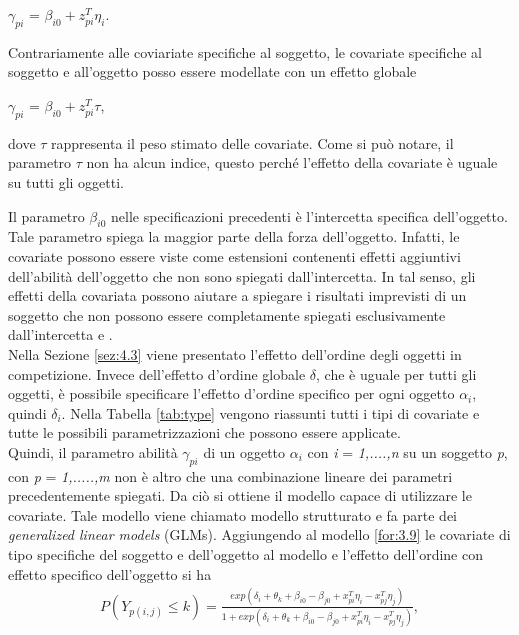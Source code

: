 \begin{itemize}
	\begin{center}
		$ \gamma_{pi}$ = $\beta_{i0} + z^{T}_{pi}\eta_i$.
	\end{center}
	Contrariamente alle coviariate specifiche al soggetto, le covariate specifiche al soggetto e all'oggetto posso essere modellate con un effetto globale
	\begin{center}
		$ \gamma_{pi}$ = $\beta_{i0} + z^{T}_{pi}\tau$,
	\end{center}
	dove $\tau$ rappresenta il peso stimato delle covariate. Come si può notare, il parametro $\tau$ non ha alcun indice, questo perché l'effetto della covariate è uguale su tutti gli oggetti.
\end{itemize}


Il parametro $\beta_{i0}$ nelle specificazioni precedenti è l'intercetta specifica dell'oggetto. Tale parametro spiega la maggior parte della forza dell'oggetto. Infatti, le covariate possono essere viste come estensioni contenenti effetti aggiuntivi dell'abilità dell'oggetto che non sono spiegati dall'intercetta. In tal senso, gli effetti della covariata possono aiutare a spiegare i risultati imprevisti di un soggetto che non possono essere completamente spiegati esclusivamente dall'intercetta \autocite{cattelan2012models} e \autocite{schauberger2017}.\\
Nella Sezione \ref{sez:4.3} viene presentato l'effetto dell'ordine degli oggetti in competizione. Invece dell'effetto d'ordine globale $\delta$, che è uguale per tutti gli oggetti, è possibile specificare l'effetto d'ordine specifico per ogni oggetto $\alpha_i$, quindi $\delta_i$. Nella Tabella \ref{tab:type} vengono riassunti tutti i tipi di covariate e tutte le possibili parametrizzazioni che possono essere applicate.\\
Quindi, il parametro abilità $\gamma_{pi}$ di un oggetto $\alpha_i$ con \emph{i} = \emph{1,....,n} su un soggetto \emph{p}, con \emph{p} = \emph{1,.....,m} non è altro che una combinazione lineare dei parametri precedentemente spiegati. Da ciò si ottiene il modello capace di utilizzare le covariate. Tale modello viene chiamato modello strutturato e fa parte dei \emph{generalized linear models} (GLMs). Aggiungendo al modello \ref{for:3.9} le covariate di tipo specifiche del soggetto e dell'oggetto al modello e l'effetto dell'ordine con effetto specifico dell'oggetto si ha
\begin{align}
	P(Y_{p(i,j)}\leq k) =  \frac{exp(\delta_i + \theta_{k} + \beta_{i0} - \beta_{j0} + x^T_{pi}\eta_i - x^T_{pj}\eta_j)}{1 + exp(\delta_i + \theta_{k} + \beta_{i0} - \beta_{j0} + x^T_{pi}\eta_i - x^T_{pj}\eta_j)}, \label{for:4.9}
\end{align}
